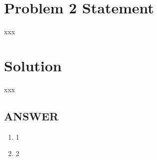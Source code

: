 \section*{Problem 2 Statement}

xxx

\section*{Solution}

xxx

\vfill
\subsection*{ANSWER}
\begin{enumerate}
    \item 1
    \item 2
\end{enumerate}